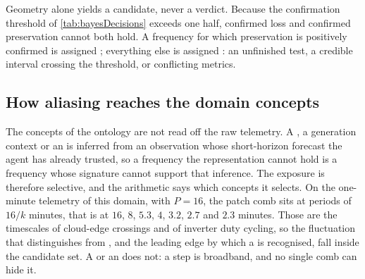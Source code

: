 %
%
%
%

Geometry alone yields a candidate, never a verdict. Because the confirmation
threshold of \autoref{tab:bayesDecisions} exceeds one half, confirmed loss and
confirmed preservation cannot both hold. A frequency for which preservation is
positively confirmed is assigned ; everything else is
assigned : an unfinished test, a credible interval
crossing the threshold, or conflicting metrics.

\subsection{How aliasing reaches the domain concepts}

The concepts of the ontology are not read off the raw telemetry. A
, a  generation context or an
 is inferred from an observation whose short-horizon
forecast the agent has already trusted, so a frequency the representation
cannot hold is a frequency whose signature cannot support that inference. The
exposure is therefore selective, and the arithmetic says which concepts it
selects. On the one-minute telemetry of this domain, with $P=16$, the patch
comb sits at periods of $16/k$ minutes, that is at $16$, $8$, $5.3$, $4$,
$3.2$, $2.7$ and $2.3$ minutes. Those are the timescales of cloud-edge
crossings and of inverter duty cycling, so the fluctuation that distinguishes
 from , and the leading edge by which a
 is recognised, fall inside the candidate set. A
 or an  does not: a step is
broadband, and no single comb can hide it.

